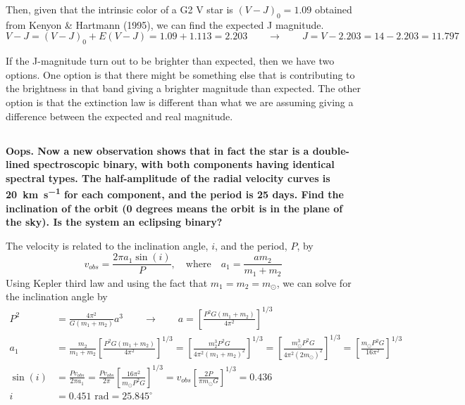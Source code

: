 Then, given that the intrinsic color of a G2 V star is $(V-J)_0=1.09$ obtained from Kenyon \& Hartmann (1995), we can find the expected J magnitude.
\begin{equation*}
    V-J = (V-J)_0 + E(V-J) = 1.09 + 1.113 = 2.203 \qquad\rightarrow\qquad J= V-2.203 = 14 - 2.203 = 11.797
\end{equation*}

If the J-magnitude turn out to be brighter than expected, then we have two options. One option is that there might be something else that is contributing to the brightness in that band giving a brighter magnitude than expected. The other option is that the extinction law is different than what we are assuming giving a difference between the expected and real magnitude.  


\subsection{}
\textbf{Oops. Now a new observation shows that in fact the star is a double-lined spectroscopic binary, with both components having identical spectral types.
The half-amplitude of the radial velocity curves is \SI{20}{\kilo\meter\per\second} for each component, and the period is 25 days.
Find the inclination of the orbit (0 degrees means the orbit is in the plane of the sky).
Is the system an eclipsing binary?}

The velocity is related to the inclination angle, $i$, and the period, $P$, by
\begin{equation}
    v_{obs} = \frac{2\pi a_1 \sin(i)}{P}, \quad\mathrm{where}\quad a_1 = \frac{am_2}{m_1+m_2}
\end{equation}
Using Kepler third law and using the fact that $m_1=m_2=m_\odot$, we can solve for the inclination angle by
\begin{align*}
    P^2 &= \frac{4\pi^2}{G(m_1+m_2)}a^3 \qquad\rightarrow\qquad a = \left[\frac{P^2G(m_1+m_2)}{4\pi^2}\right]^{1/3}\\
    a_1 &= \frac{m_2}{m_1+m_2}\left[\frac{P^2G(m_1+m_2)}{4\pi^2}\right]^{1/3} = \left[\frac{m_2^3P^2G}{4\pi^2(m_1+m_2)^2}\right]^{1/3} = \left[\frac{m_\odot^3P^2G}{4\pi^2(2m_\odot)^2}\right]^{1/3} = \left[\frac{m_\odot P^2G}{16\pi^2}\right]^{1/3}\\
    \sin(i) &= \frac{Pv_{obs}}{2\pi a_1} = \frac{Pv_{obs}}{2\pi}\left[\frac{16\pi^2}{m_\odot P^2G}\right]^{1/3} = v_{obs}\left[\frac{2P}{\pi m_\odot G}\right]^{1/3} = 0.436\\
    i &= 0.451\text{ rad} = 25.845^\circ
\end{align*}

